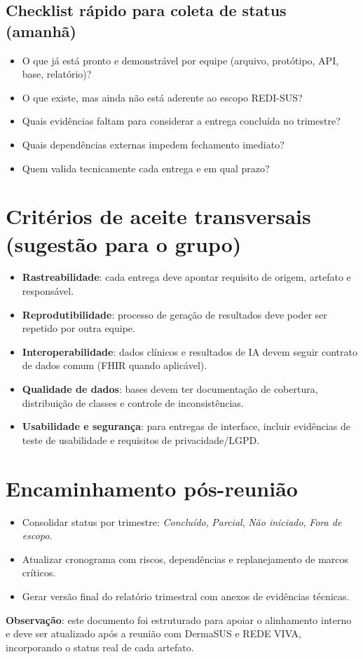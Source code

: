 \documentclass[
    12pt,
    openright,
    oneside,
    a4paper,
    chapter=TITLE,
    section=TITLE,
    brazil,
    sumario=tradicional,
    hidelinks
]{abntex2}
\begin{document}
\subsection{Checklist rápido para coleta de status (amanhã)}
\begin{itemize}
    \item O que já está pronto e demonstrável por equipe (arquivo, protótipo, API, base, relatório)?
    \item O que existe, mas ainda não está aderente ao escopo REDI-SUS?
    \item Quais evidências faltam para considerar a entrega concluída no trimestre?
    \item Quais dependências externas impedem fechamento imediato?
    \item Quem valida tecnicamente cada entrega e em qual prazo?
\end{itemize}

\section{Critérios de aceite transversais (sugestão para o grupo)}
\begin{itemize}
    \item \textbf{Rastreabilidade}: cada entrega deve apontar requisito de origem, artefato e responsável.
    \item \textbf{Reprodutibilidade}: processo de geração de resultados deve poder ser repetido por outra equipe.
    \item \textbf{Interoperabilidade}: dados clínicos e resultados de IA devem seguir contrato de dados comum (FHIR quando aplicável).
    \item \textbf{Qualidade de dados}: bases devem ter documentação de cobertura, distribuição de classes e controle de inconsistências.
    \item \textbf{Usabilidade e segurança}: para entregas de interface, incluir evidências de teste de usabilidade e requisitos de privacidade/LGPD.
\end{itemize}

\section{Encaminhamento pós-reunião}
\begin{itemize}
    \item Consolidar status por trimestre: \textit{Concluído}, \textit{Parcial}, \textit{Não iniciado}, \textit{Fora de escopo}.
    \item Atualizar cronograma com riscos, dependências e replanejamento de marcos críticos.
    \item Gerar versão final do relatório trimestral com anexos de evidências técnicas.
\end{itemize}

\vspace{0.5cm}
\noindent\textbf{Observação}: este documento foi estruturado para apoiar o alinhamento interno e deve ser atualizado após a reunião com DermaSUS e REDE VIVA, incorporando o status real de cada artefato.

\postextual
\end{document}
